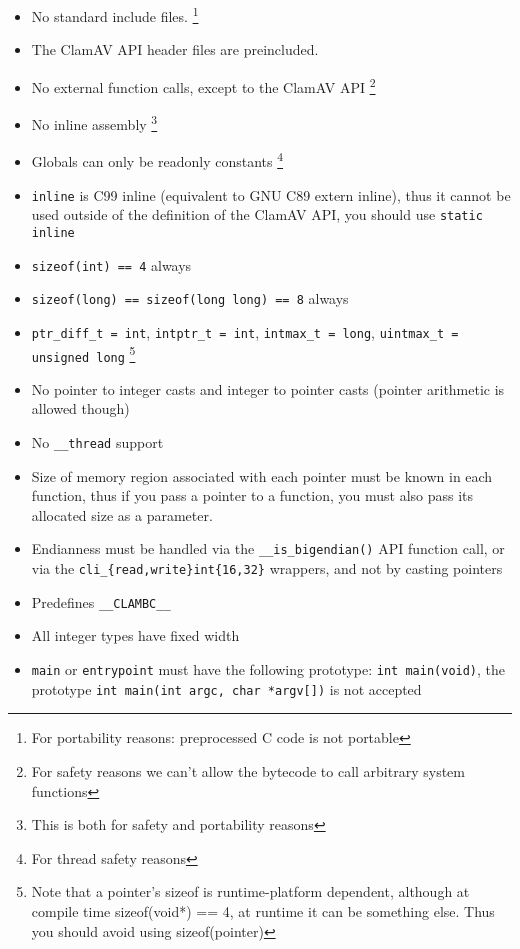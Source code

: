 \begin{itemize}
 \item No standard include files. \footnote{For portability reasons: preprocessed C code is not portable}
 \item The ClamAV API header files are preincluded.
 \item No external function calls, except to the ClamAV API \footnote{For safety reasons we can't allow the bytecode to call arbitrary system functions}
 \item No inline assembly \footnote{This is both for safety and portability reasons}
 \item Globals can only be readonly constants \footnote{For thread safety reasons}
 \item \verb+inline+ is C99 inline (equivalent to GNU C89 extern inline), thus it cannot be used outside of the definition of the ClamAV API,
you should use \verb+static inline+
 \item \verb+sizeof(int) == 4+ always
 \item \verb+sizeof(long) == sizeof(long long) == 8+ always
 \item \verb+ptr_diff_t = int+, \verb+intptr_t = int+, \verb+intmax_t = long+, \verb+uintmax_t = unsigned long+ 
\footnote{Note that a pointer's sizeof is runtime-platform dependent, although at compile time sizeof(void*) == 4, at runtime it can be something else.
Thus you should avoid using sizeof(pointer)}
 \item No pointer to integer casts and integer to pointer casts (pointer arithmetic is allowed though)
 \item No \verb+__thread+ support
 \item Size of memory region associated with each pointer must be known in each function, thus if you pass a pointer to a function,
you must also pass its allocated size as a parameter.
 \item Endianness must be handled via the \verb+__is_bigendian()+ API function call, or via the \verb+cli_{read,write}int{16,32}+ wrappers,
and not by casting pointers
 \item Predefines \verb+__CLAMBC__+
 \item All integer types have fixed width
 \item \verb+main+ or \verb+entrypoint+ must have the following prototype: \verb+int main(void)+, the prototype
\verb+int main(int argc, char *argv[])+ is not accepted %
\end{itemize}

